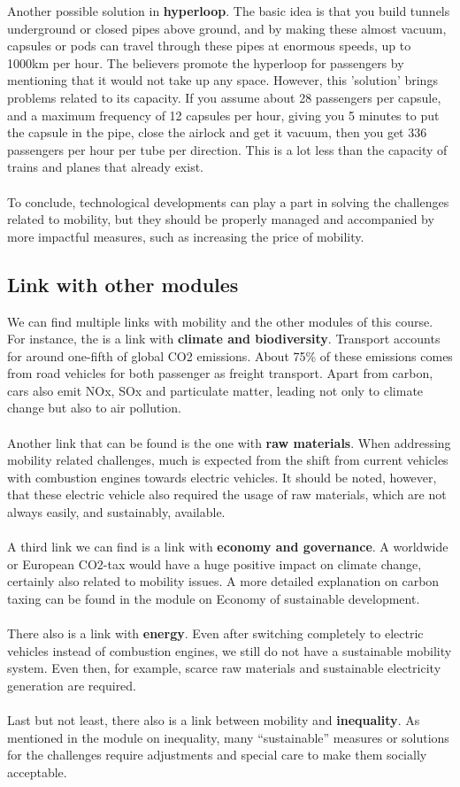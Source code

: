 \documentclass[../summary.tex]{subfiles}
\begin{document}
	 Another possible solution in \textbf{hyperloop}. The basic idea is that you build tunnels underground or closed pipes above ground, and by making these almost vacuum, capsules or pods can travel through these pipes at enormous speeds, up to 1000km per hour. The believers promote the hyperloop for passengers by mentioning that it would not take up any space. However, this 'solution' brings problems related to its capacity. If you assume about 28 passengers per capsule, and a maximum frequency of 12 capsules per hour, giving you 5 minutes to put the capsule in the pipe, close the airlock and get it vacuum, then you get 336 passengers per hour per tube per direction. This is a lot less than the capacity of trains and planes that already exist. 
	 \\\\
	 To conclude, technological developments can play a part in solving the challenges related to mobility, but they should be properly managed and accompanied by more impactful measures, such as increasing the price of mobility.
	
	\subsection{Link with other modules}
	
	We can find multiple links with mobility and the other modules of this course. For instance, the is a link with \textbf{climate and biodiversity}. Transport accounts for around one-fifth of global CO2 emissions. About 75\% of these emissions comes from road vehicles for both passenger as freight transport. Apart from carbon, cars also emit NOx, SOx and particulate matter, leading not only to climate change but also to air pollution. 
	\\\\
	Another link that can be found is the one with \textbf{raw materials}. When addressing mobility related challenges, much is expected from the shift from current vehicles with combustion engines towards electric vehicles. It should be noted, however, that these electric vehicle also required the usage of raw materials, which are not always easily, and sustainably, available. 
	\\\\
	A third link we can find is a link with \textbf{economy and governance}. A worldwide or European CO2-tax would have a huge positive impact on climate change, certainly also related to mobility issues. A more detailed explanation on carbon taxing can be found in the module on Economy of sustainable development. 
	\\\\
	There also is a link with \textbf{energy}. Even after switching completely to electric vehicles instead of combustion engines, we still do not have a sustainable mobility system. Even then, for example, scarce raw materials and sustainable electricity generation are required.
	\\\\
	Last but not least, there also is a link between mobility and \textbf{inequality}. As mentioned in the module on inequality, many “sustainable” measures or solutions for the challenges require adjustments and special care to make them socially acceptable.
	
\end{document}
